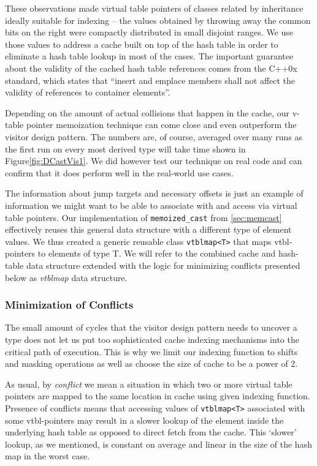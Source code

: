 \documentclass[preprint]{sigplanconf}
\makeatletter
\DeclareRobustCommand{\code}[1]{{\lstinline[breaklines=false,escapechar=@]{#1}}}
\makeatother
\begin{document}
These observations made virtual table pointers of classes related by inheritance 
ideally suitable for indexing -- the values obtained by throwing away the common 
bits on the right were compactly distributed in small disjoint ranges. We use 
those values to address a cache built on top of the hash table in order to 
eliminate a hash table lookup in most of the cases.  The important 
guarantee about the validity of the cached hash table references comes from the 
C++0x standard, which states that ``insert and emplace members shall not affect 
the validity of references to container elements''\cite[.5(13)]{C++0x}. 

Depending on the amount of actual collisions that happen in the cache, our 
v-table pointer memoization technique can come close and even outperform the 
visitor design pattern. The numbers are, of course, averaged over many runs as 
the first run on every most derived type will take time shown in 
Figure\ref{fig:DCastVis1}. We did however test our technique on real code and 
can confirm that it does perform well in the real-world use cases.

The information about jump targets and necessary offsets is just an example of 
information we might want to be able to associate with and access via virtual 
table pointers. Our implementation of \code{memoized_cast} from 
\textsection\ref{sec:memcast} effectively reuses this general data structure with 
a different type of element values. We thus created a generic reusable class 
\code{vtblmap<T>} that maps vtbl-pointers to elements of type T. We will refer 
to the combined cache and hash-table data structure extended with the logic for 
minimizing conflicts presented below as \emph{vtblmap} data structure.

\subsubsection{Minimization of Conflicts}
\label{sec:moc}

The small amount of cycles that the visitor design pattern needs to uncover a 
type does not let us put too sophisticated cache indexing mechanisms into the 
critical path of execution. This is why we limit our indexing function to shifts 
and masking operations as well as choose the size of cache to be a power of 2.

As usual, by \emph{conflict} we mean a situation in which two or more virtual 
table pointers are mapped to the same location in cache using given indexing 
function. Presence of conflicts means that accessing values of \code{vtblmap<T>} 
associated with some vtbl-pointers may result in a slower lookup of the element 
inside the underlying hash table as opposed to direct fetch from the cache.
This `slower' lookup, as we mentioned, is constant on average and linear in the 
size of the hash map in the worst case.
\end{document}
